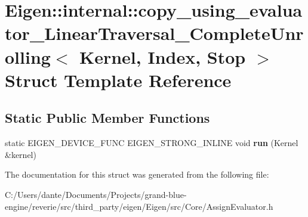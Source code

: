 \hypertarget{struct_eigen_1_1internal_1_1copy__using__evaluator___linear_traversal___complete_unrolling}{}\section{Eigen\+::internal\+::copy\+\_\+using\+\_\+evaluator\+\_\+\+Linear\+Traversal\+\_\+\+Complete\+Unrolling$<$ Kernel, Index, Stop $>$ Struct Template Reference}
\label{struct_eigen_1_1internal_1_1copy__using__evaluator___linear_traversal___complete_unrolling}
\subsection*{Static Public Member Functions}
\begin{DoxyCompactItemize}
\item 
\mbox{\label{struct_eigen_1_1internal_1_1copy__using__evaluator___linear_traversal___complete_unrolling_a290a74d6dfcf33ce64f78513f29574e9}} 
static E\+I\+G\+E\+N\+\_\+\+D\+E\+V\+I\+C\+E\+\_\+\+F\+U\+NC E\+I\+G\+E\+N\+\_\+\+S\+T\+R\+O\+N\+G\+\_\+\+I\+N\+L\+I\+NE void {\bfseries run} (Kernel \&kernel)
\end{DoxyCompactItemize}


The documentation for this struct was generated from the following file\+:\begin{DoxyCompactItemize}
\item 
C\+:/\+Users/dante/\+Documents/\+Projects/grand-\/blue-\/engine/reverie/src/third\+\_\+party/eigen/\+Eigen/src/\+Core/Assign\+Evaluator.\+h\end{DoxyCompactItemize}
